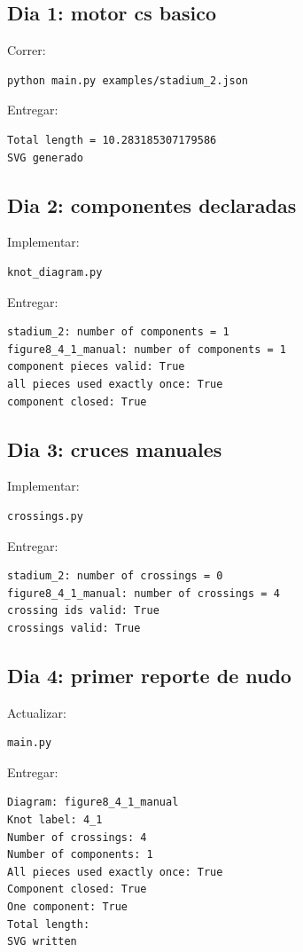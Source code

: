 \documentclass[11pt,letterpaper]{amsart}
\begin{document}
\subsection*{Dia 1: motor cs basico}

Correr:
\begin{verbatim}
python main.py examples/stadium_2.json
\end{verbatim}

Entregar:
\begin{verbatim}
Total length = 10.283185307179586
SVG generado
\end{verbatim}

\subsection*{Dia 2: componentes declaradas}

Implementar:
\begin{verbatim}
knot_diagram.py
\end{verbatim}

Entregar:
\begin{verbatim}
stadium_2: number of components = 1
figure8_4_1_manual: number of components = 1
component pieces valid: True
all pieces used exactly once: True
component closed: True
\end{verbatim}

\subsection*{Dia 3: cruces manuales}

Implementar:
\begin{verbatim}
crossings.py
\end{verbatim}

Entregar:
\begin{verbatim}
stadium_2: number of crossings = 0
figure8_4_1_manual: number of crossings = 4
crossing ids valid: True
crossings valid: True
\end{verbatim}

\subsection*{Dia 4: primer reporte de nudo}

Actualizar:
\begin{verbatim}
main.py
\end{verbatim}

Entregar:
\begin{verbatim}
Diagram: figure8_4_1_manual
Knot label: 4_1
Number of crossings: 4
Number of components: 1
All pieces used exactly once: True
Component closed: True
One component: True
Total length:
SVG written
\end{verbatim}
\end{document}

